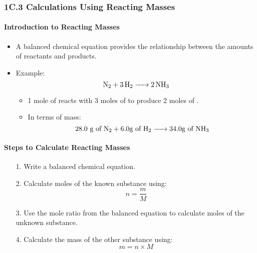 
\subsubsection{1C.3 Calculations Using Reacting Masses}
\paragraph{Introduction to Reacting Masses}
\begin{itemize}
    \item A balanced chemical equation provides the relationship between the amounts of reactants and products.
    \item Example:
    \begin{equation}
        \ce{N2 + 3H2 -> 2NH3}
    \end{equation}
    \begin{itemize}
        \item 1 mole of  reacts with 3 moles of  to produce 2 moles of .
        \item In terms of mass:
        \begin{equation}
            28.0 \text{ g of \ce{N2}} + 6.0 \text{g of \ce{H2}} \ce{->} 34.0 \text{g of \ce{NH3}}
        \end{equation}
    \end{itemize}
\end{itemize}

\paragraph{Steps to Calculate Reacting Masses}
\begin{itemize}
    \item[1.] Write a balanced chemical equation.
    \item[2.] Calculate moles of the known substance using:
    \begin{equation}
        n = \frac{m}{M}
    \end{equation}
    \item[3.] Use the mole ratio from the balanced equation to calculate moles of the unknown substance.
    \item[4.] Calculate the mass of the other substance using:
    \begin{equation}
        m = n \times M
    \end{equation}
\end{itemize}